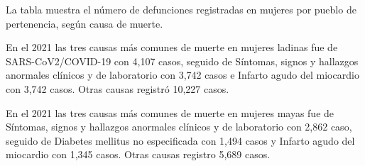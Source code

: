 La tabla muestra el número de defunciones registradas en mujeres por pueblo de pertenencia, según causa de muerte. 

En el 2021 las tres causas más comunes de muerte en mujeres ladinas fue de SARS-CoV2/COVID-19 con 4,107 casos, seguido de 	Síntomas, signos y hallazgos anormales clínicos y de laboratorio con 3,742 casos e Infarto agudo del miocardio con 3,742 casos. Otras causas registró 10,227 casos. 

En el 2021 las tres causas más comunes de muerte en mujeres mayas fue de Síntomas, signos y hallazgos anormales clínicos y de laboratorio con 2,862 caso, seguido de Diabetes mellitus no especificada con 1,494 casos y Infarto agudo del miocardio con 1,345 casos. Otras causas registro 5,689 casos.